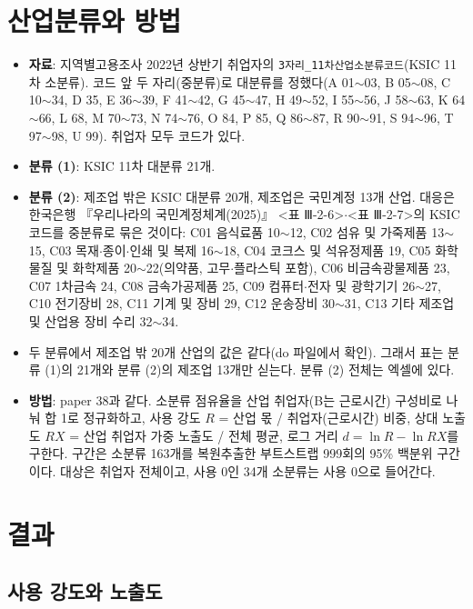 \documentclass[11pt]{article}
\begin{document}
\section{산업분류와 방법}

\begin{itemize}[leftmargin=*]
  \item \textbf{자료}: 지역별고용조사 2022년 상반기 취업자의 \texttt{3자리\_11차산업소분류코드}(KSIC 11차 소분류). 코드 앞 두 자리(중분류)로 대분류를 정했다(A 01$\sim$03, B 05$\sim$08, C 10$\sim$34, D 35, E 36$\sim$39, F 41$\sim$42, G 45$\sim$47, H 49$\sim$52, I 55$\sim$56, J 58$\sim$63, K 64$\sim$66, L 68, M 70$\sim$73, N 74$\sim$76, O 84, P 85, Q 86$\sim$87, R 90$\sim$91, S 94$\sim$96, T 97$\sim$98, U 99). 취업자 모두 코드가 있다.
  \item \textbf{분류 (1)}: KSIC 11차 대분류 21개.
  \item \textbf{분류 (2)}: 제조업 밖은 KSIC 대분류 20개, 제조업은 국민계정 13개 산업. 대응은 한국은행 『우리나라의 국민계정체계(2025)』 <표 Ⅲ-2-6>$\cdot$<표 Ⅲ-2-7>의 KSIC 코드를 중분류로 묶은 것이다: C01 음식료품 10$\sim$12, C02 섬유 및 가죽제품 13$\sim$15, C03 목재$\cdot$종이$\cdot$인쇄 및 복제 16$\sim$18, C04 코크스 및 석유정제품 19, C05 화학물질 및 화학제품 20$\sim$22(의약품, 고무$\cdot$플라스틱 포함), C06 비금속광물제품 23, C07 1차금속 24, C08 금속가공제품 25, C09 컴퓨터$\cdot$전자 및 광학기기 26$\sim$27, C10 전기장비 28, C11 기계 및 장비 29, C12 운송장비 30$\sim$31, C13 기타 제조업 및 산업용 장비 수리 32$\sim$34.
  \item 두 분류에서 제조업 밖 20개 산업의 값은 같다(do 파일에서 확인). 그래서 표는 분류 (1)의 21개와 분류 (2)의 제조업 13개만 싣는다. 분류 (2) 전체는 엑셀에 있다.
  \item \textbf{방법}: paper 38과 같다. 소분류 점유율을 산업 취업자(B는 근로시간) 구성비로 나눠 합 1로 정규화하고, 사용 강도 $R$ = 산업 몫 / 취업자(근로시간) 비중, 상대 노출도 $RX$ = 산업 취업자 가중 노출도 / 전체 평균, 로그 거리 $d = \ln R - \ln RX$를 구한다. 구간은 소분류 163개를 복원추출한 부트스트랩 999회의 95\% 백분위 구간이다. 대상은 취업자 전체이고, 사용 0인 34개 소분류는 사용 0으로 들어간다.
\end{itemize}

\section{결과}

\subsection{사용 강도와 노출도}
\end{document}
